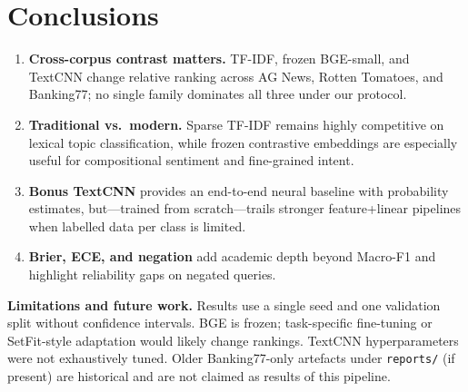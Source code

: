 \section{Conclusions}

\begin{enumerate}
  \item \textbf{Cross-corpus contrast matters.} TF-IDF, frozen BGE-small, and TextCNN change relative ranking across AG News, Rotten Tomatoes, and Banking77; no single family dominates all three under our protocol.
  \item \textbf{Traditional vs.\ modern.} Sparse TF-IDF remains highly competitive on lexical topic classification, while frozen contrastive embeddings are especially useful for compositional sentiment and fine-grained intent.
  \item \textbf{Bonus TextCNN} provides an end-to-end neural baseline with probability estimates, but---trained from scratch---trails stronger feature+linear pipelines when labelled data per class is limited.
  \item \textbf{Brier, ECE, and negation} add academic depth beyond Macro-F1 and highlight reliability gaps on negated queries.
\end{enumerate}

\textbf{Limitations and future work.} Results use a single seed and one validation split without confidence intervals. BGE is frozen; task-specific fine-tuning or SetFit-style adaptation would likely change rankings. TextCNN hyperparameters were not exhaustively tuned. Older Banking77-only artefacts under \texttt{reports/} (if present) are historical and are not claimed as results of this pipeline.
